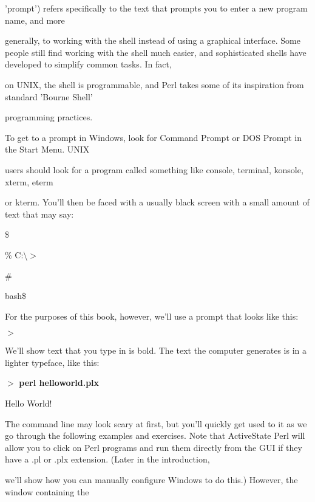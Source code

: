 \documentclass[a4paper,11pt]{book}
\begin{document}
\noindent 'prompt') refers specifically to the text that prompts you to enter a new program name, and more

\noindent generally, to working with the shell instead of using a graphical interface. Some people still find working with the shell much easier, and sophisticated shells have developed to simplify common tasks. In fact,

\noindent on UNIX, the shell is programmable, and Perl takes some of its inspiration from standard 'Bourne Shell'

\noindent programming practices.

\noindent 

\noindent To get to a prompt in Windows, look for Command Prompt or DOS Prompt in the Start Menu. UNIX

\noindent users should look for a program called something like console, terminal, konsole, xterm, eterm

\noindent or kterm. You'll then be faced with a usually black screen with a small amount of text that may say:

\noindent 

\noindent \$

\noindent \% C:\textbackslash $>$

\noindent \#

\noindent bash\$

\noindent 

\noindent For the purposes of this book, however, we'll use a prompt that looks like this:

\noindent 

\noindent $>$

\noindent 

\noindent We'll show text that you type in is bold. The text the computer generates is in a lighter typeface, like this:

\noindent 

\noindent $>$ \textbf{perl helloworld.plx}

\noindent Hello World!

\noindent 

\noindent The command line may look scary at first, but you'll quickly get used to it as we go through the following examples and exercises. Note that ActiveState Perl will allow you to click on Perl programs and run them directly from the GUI if they have a .pl or .plx extension. (Later in the introduction,

\noindent we'll show how you can manually configure Windows to do this.) However, the window containing the
\end{document}
